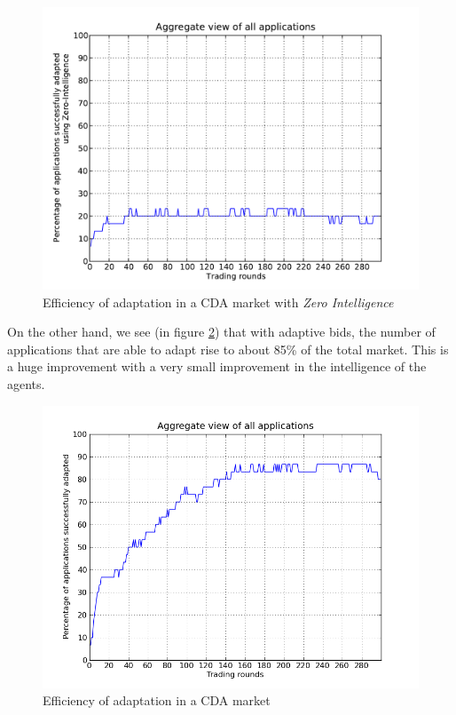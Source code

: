 \documentclass[10pt,journal,compsoc]{IEEEtran}
\begin{document}
\begin{figure}[h]
	\centering
    \includegraphics[scale=0.45, clip, trim=0cm 1cm 1cm 0.8cm]{graphs/efficiency-of-zi.pdf}
    \caption{Efficiency of adaptation in a CDA market with \textit{Zero Intelligence}\label{fig:cda_zi_market_satisfaction}}
\end{figure}

On the other hand, we see (in figure \ref{fig:cda_zip_market_satisfaction}) that with adaptive bids, the number of applications that are able to adapt rise to about 85\% of the total market. This is a huge improvement with a very small improvement in the intelligence of the agents.
\begin{figure}[h]
	\centering
	 \includegraphics[scale=0.45, clip, trim=0cm 1cm 2cm 0.8cm]{graphs/probabilistic-change-to-qa.png}
	 \caption{Efficiency of adaptation in a CDA market \label{fig:cda_zip_market_satisfaction}}
\end{figure} 
\end{document}
